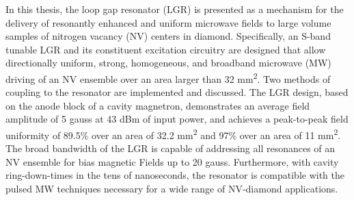 % 
% 
%


In this thesis, the loop gap resonator (LGR) is presented as a mechanism for the delivery of resonantly enhanced and uniform microwave fields to large volume samples of nitrogen vacancy (NV) centers in diamond. Specifically, an S-band tunable LGR and its constituent excitation circuitry are designed that allow directionally uniform, strong, homogeneous, and broadband
microwave (MW) driving of an NV ensemble over an area larger than 32 mm\textsuperscript{2}. Two methods of coupling to the resonator are implemented and discussed. The LGR design, based on the anode
block of a cavity magnetron, demonstrates an average field amplitude of 5 gauss at 43 dBm of input power, and achieves a peak-to-peak
field uniformity of 89.5\% over an area of 32.2 mm\textsuperscript{2} and 97\% over an area of 11 mm\textsuperscript{2}. The broad bandwidth of the LGR is capable of addressing all resonances of an NV ensemble for bias magnetic Fields up to 20 gauss. Furthermore, with cavity
ring-down-times in the tens of nanoseconds, the resonator is compatible with the pulsed MW techniques necessary for a wide range of NV-diamond
applications.

